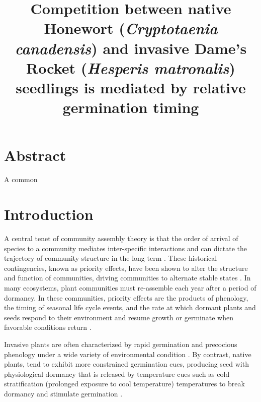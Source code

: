 \documentclass{article}\usepackage[]{graphicx}\usepackage[]{color}
\title{Competition between native Honewort (\textit{Cryptotaenia canadensis}) and invasive Dame's Rocket (\textit{Hesperis matronalis}) seedlings is mediated by relative germination timing}
\begin{document}
\maketitle


\section*{Abstract}
A common 
\section*{Introduction}
 A central tenet of community assembly theory is that the order of arrival of species to a community mediates inter-specific interactions and can dictate the trajectory of community structure in the long term \citep{Fukami2015}. These historical contingencies, known as priority effects, have been shown to alter the structure and function of communities, driving communities to alternate stable states \citep{Fukami2011}. In many ecosystems, plant communities must re-assemble each year after a period of dormancy. In these communities, priority effects are the products of phenology, the timing of seasonal life cycle events, and the rate at which dormant plants and seeds respond to their environment and resume growth or germinate when favorable conditions return \citep{Rudolf:2019aa}.%

Invasive plants are often characterized by rapid germination and precocious phenology under a wide variety of environmental condition \citep{Gioria2018,Gioria:2017wo,Wolkovich:2011uh,Smith:2013uj}. By contrast, native plants, tend to exhibit more constrained germination cues\citep{Marushia:2010ug}, producing seed with physiological dormancy that is released by temperature cues such as cold stratification (prolonged exposure to cool temperature) temperatures to break dormancy and stimulate germination \citep{Brink:2013wr,Cavieres:2017aa,Bradford:2007tj} .%
\end{document}
